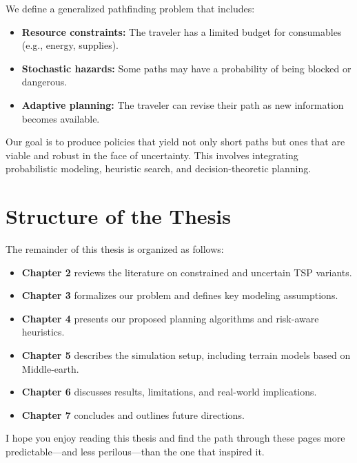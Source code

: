 \documentclass[main.tex]{subfiles}
\begin{document}
\noindent
We define a generalized pathfinding problem that includes:
\begin{itemize}
    \item \textbf{Resource constraints:} The traveler has a limited budget for consumables (e.g., energy, supplies).
    \item \textbf{Stochastic hazards:} Some paths may have a probability of being blocked or dangerous.
    \item \textbf{Adaptive planning:} The traveler can revise their path as new information becomes available.
\end{itemize}

Our goal is to produce policies that yield not only short paths but ones that are viable and robust in the face of uncertainty. This involves integrating probabilistic modeling, heuristic search, and decision-theoretic planning.

\section{Structure of the Thesis}

\noindent
The remainder of this thesis is organized as follows:
\begin{itemize}
    \item \textbf{Chapter 2} reviews the literature on constrained and uncertain TSP variants.
    \item \textbf{Chapter 3} formalizes our problem and defines key modeling assumptions.
    \item \textbf{Chapter 4} presents our proposed planning algorithms and risk-aware heuristics.
    \item \textbf{Chapter 5} describes the simulation setup, including terrain models based on Middle-earth.
    \item \textbf{Chapter 6} discusses results, limitations, and real-world implications.
    \item \textbf{Chapter 7} concludes and outlines future directions.
\end{itemize}

\noindent
I hope you enjoy reading this thesis and find the path through these pages more predictable—and less perilous—than the one that inspired it.
\end{document}
